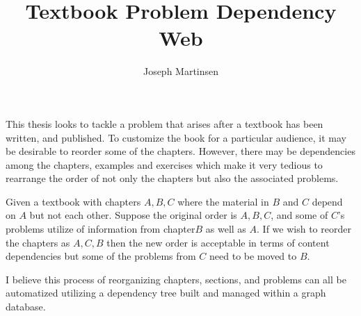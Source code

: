 \documentclass[a4paper,11pt]{article}
\title{Textbook Problem Dependency Web}
\author{Joseph Martinsen}
\begin{document}
\maketitle

This thesis looks to tackle a problem that arises after a textbook
has been written, and published. To customize the book for a particular
audience, it may be desirable to reorder some of the chapters.
However, there may be dependencies among the chapters, examples and exercises
which make it very tedious to rearrange the order of not only the chapters but
also the associated problems.

Given a textbook with chapters \(A, B, C\) where the material in \(B\) and \(C\)
depend on \(A\) but not each other. Suppose the original order is  \(A, B, C\),
and some of \(C\)'s problems utilize of information from chapter\(B\) as well as \(A\).
If we wish to reorder the chapters as \(A, C, B\) then the new order
is acceptable in terms of content dependencies but some of the problems from \(C\)
need to be moved to \(B\).

I believe this process of reorganizing chapters, sections, and problems can all
be automatized utilizing a dependency tree built and managed within a graph
database.
\end{document}
